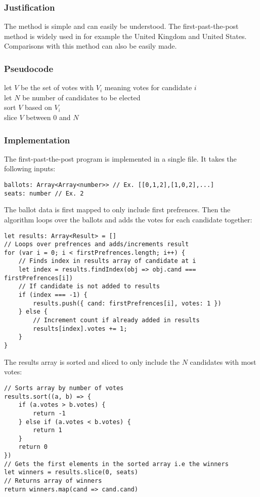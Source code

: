 \subsubsection{Justification}
The method is simple and can easily be understood. The first-past-the-post method is widely used in for example the United Kingdom and United States. Comparisons with this method can also be easily made.
\subsubsection{Pseudocode}
let $V$ be the set of votes with $V_{i}$ meaning votes for candidate $i$ \\
let $N$ be number of candidates to be elected \\
sort $V$ based on $V_{i}$\\
slice $V$ between $0$ and $N$
\subsubsection{Implementation}
The first-past-the-post program is implemented in a single file. It takes the following inputs:
\begin{lstlisting}
ballots: Array<Array<number>> // Ex. [[0,1,2],[1,0,2],...]
seats: number // Ex. 2
\end{lstlisting}
The ballot data is first mapped to only include first prefrences. Then the algorithm loops over the ballots and adds the votes for each candidate together:
\begin{lstlisting}
let results: Array<Result> = []
// Loops over prefrences and adds/increments result
for (var i = 0; i < firstPrefrences.length; i++) {
    // Finds index in results array of candidate at i
    let index = results.findIndex(obj => obj.cand === firstPrefrences[i])
    // If candidate is not added to results
    if (index === -1) {
        results.push({ cand: firstPrefrences[i], votes: 1 })
    } else {
        // Increment count if already added in results
        results[index].votes += 1;
    }
}
\end{lstlisting}
The results array is sorted and sliced to only include the $N$ candidates with most votes:
\begin{lstlisting}
// Sorts array by number of votes
results.sort((a, b) => {
    if (a.votes > b.votes) {
        return -1
    } else if (a.votes < b.votes) {
        return 1
    }
    return 0
})
// Gets the first elements in the sorted array i.e the winners
let winners = results.slice(0, seats)
// Returns array of winners
return winners.map(cand => cand.cand)
\end{lstlisting}
